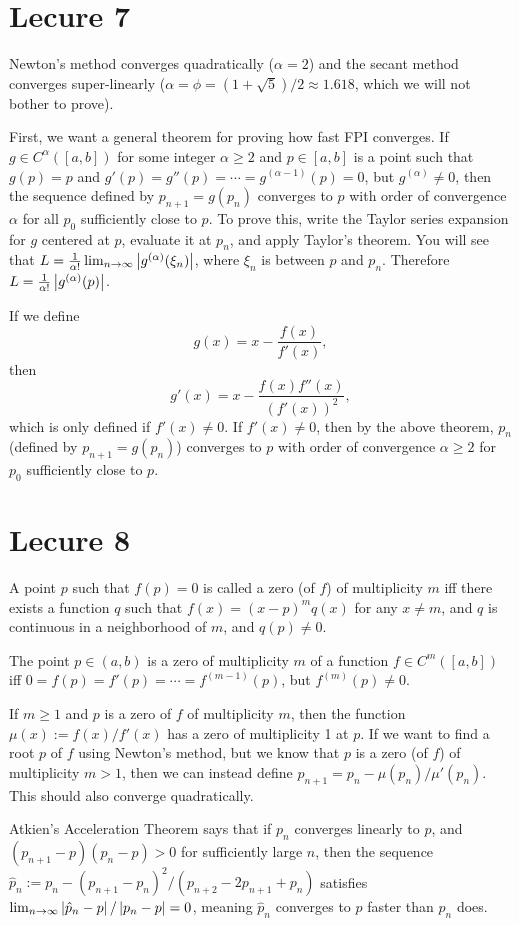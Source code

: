 \documentclass{article}
\begin{document}
\section{Lecure 7}
Newton's method converges quadratically ($\alpha = 2$) and the secant method converges super-linearly ($\alpha =\phi = (1 + \sqrt{5})/2 \approx 1.618$, which we will not bother to prove).
\par
First, we want a general theorem for proving how fast FPI converges. If $g \in C^\alpha([a,b])$ for some integer $\alpha \geq 2$ and $p \in [a,b]$ is a point such that $g(p)=p$ and $g'(p)=g''(p)=\cdots = g^{(\alpha-1)}(p)=0$, but $g^{(\alpha)} \neq 0$, then the sequence defined by $p_{n+1}=g(p_n)$ converges to $p$ with order of convergence $\alpha$ for all $p_0$ sufficiently close to $p$. To prove this, write the Taylor series expansion for $g$ centered at $p$, evaluate it at $p_n$, and apply Taylor's theorem. You will see that $L = \frac{1}{\alpha!} \lim_{n \rightarrow \infty} \left\lvert g^{(\alpha)}(\xi_n) \right\rvert$, where $\xi_n$ is between $p$ and $p_n$. Therefore $L = \frac{1}{\alpha!} \left\lvert g^{(\alpha)} (p) \right\rvert$.
\par
If we define
\[ g(x) = x - \frac{f(x)}{f'(x)}, \]
then
\[ g'(x) = x - \frac{f(x)f''(x)}{(f'(x))^2}, \]
which is only defined if $f'(x) \neq 0$. If $f'(x) \neq 0$, then by the above theorem, $p_n$ (defined by $p_{n+1} = g(p_n)$) converges to $p$ with order of convergence $\alpha \geq 2$ for $p_0$ sufficiently close to $p$.

\section{Lecure 8}
A point $p$ such that $f(p)=0$ is called a zero (of $f$) of multiplicity $m$ iff there exists a function $q$ such that $f(x) = (x-p)^m q(x)$ for any $x \neq m$, and $q$ is continuous in a neighborhood of $m$, and $q(p) \neq 0$.
\par
The point $p \in (a,b)$ is a zero of multiplicity $m$ of a function $f \in C^m([a,b])$ iff $0 = f(p) = f'(p) = \cdots = f^{(m-1)}(p)$, but $f^{(m)}(p) \neq 0$.
\par
If $m \geq 1$ and $p$ is a zero of $f$ of multiplicity $m$, then the function $\mu(x) := f(x)/f'(x)$ has a zero of multiplicity 1 at $p$. If we want to find a root $p$ of $f$ using Newton's method, but we know that $p$ is a zero (of $f$) of multiplicity $m > 1$, then we can instead define $p_{n+1} = p_n - \mu(p_n)/\mu'(p_n)$. This should also converge quadratically.
\par
Atkien's Acceleration Theorem says that if $p_n$ converges linearly to $p$, and $(p_{n+1}-p)(p_n-p)>0$ for sufficiently large $n$, then the sequence $\hat{p}_n := p_n - (p_{n+1}-p_n)^2/(p_{n+2}-2p_{n+1}+p_n)$ satisfies $\lim_{n \rightarrow \infty} \left\lvert \hat{p}_n-p \right\rvert/\left\lvert p_n-p \right\rvert = 0$, meaning $\hat{p}_n$ converges to $p$ faster than $p_n$ does.
\end{document}
